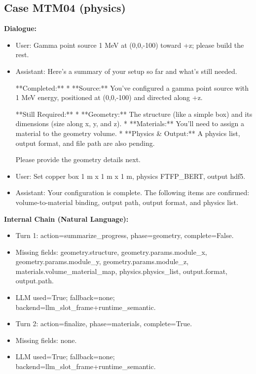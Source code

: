 \documentclass[11pt]{ctexart}
\begin{document}
\subsection{Case MTM04 (physics)}
\textbf{Dialogue:}
\begin{itemize}
\item User: Gamma point source 1 MeV at (0,0,-100) toward +z; please build the rest.
\item Assistant: Here's a summary of your setup so far and what's still needed.

**Completed:**
*   **Source:** You've configured a gamma point source with 1 MeV energy, positioned at (0,0,-100) and directed along +z.

**Still Required:**
*   **Geometry:** The structure (like a simple box) and its dimensions (size along x, y, and z).
*   **Materials:** You'll need to assign a material to the geometry volume.
*   **Physics \& Output:** A physics list, output format, and file path are also pending.

Please provide the geometry details next.
\item User: Set copper box 1 m x 1 m x 1 m, physics FTFP\_BERT, output hdf5.
\item Assistant: Your configuration is complete. The following items are confirmed: volume-to-material binding, output path, output format, and physics list.
\end{itemize}
\textbf{Internal Chain (Natural Language):}
\begin{itemize}
\item Turn 1: action=summarize\_progress, phase=geometry, complete=False.
\item Missing fields: geometry.structure, geometry.params.module\_x, geometry.params.module\_y, geometry.params.module\_z, materials.volume\_material\_map, physics.physics\_list, output.format, output.path.
\item LLM used=True; fallback=none; backend=llm\_slot\_frame+runtime\_semantic.
\item Turn 2: action=finalize, phase=materials, complete=True.
\item Missing fields: none.
\item LLM used=True; fallback=none; backend=llm\_slot\_frame+runtime\_semantic.
\end{itemize}
\end{document}
